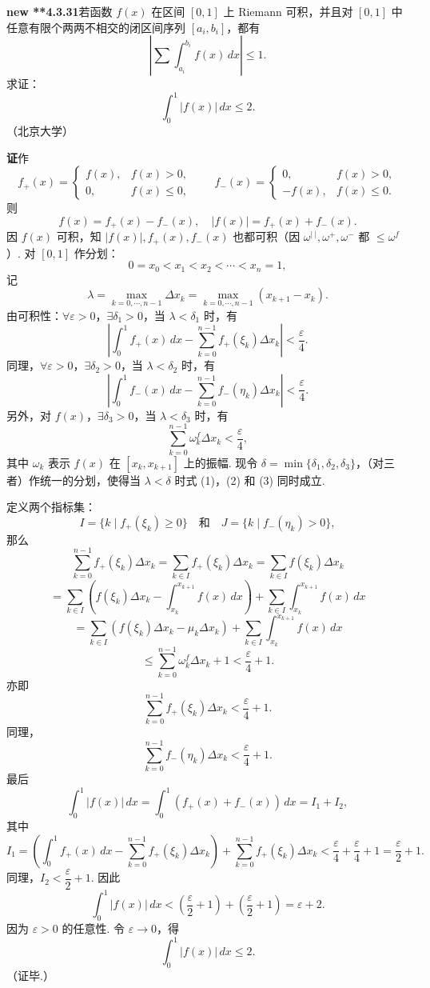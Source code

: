 \documentclass[UTF8, 12pt, fontset=fandol, oneside]{ctexart}
\begin{document}
\noindent\textbf{new **4.3.31}\quad 若函数 $f(x)$ 在区间 $[0,1]$ 上 Riemann 可积，并且对
$[0,1]$ 中任意有限个两两不相交的闭区间序列 $[a_i,b_i]$，都有
\[
\left|\sum\int_{a_i}^{b_i}f(x)\,dx\right|\le1.
\]
求证：
\[
\int_0^1|f(x)|\,dx\le2.
\]
（北京大学）

\noindent\textbf{证}\quad 作
\[
f_+(x)=
\begin{cases}
f(x),& f(x)>0,\\
0,& f(x)\le0,
\end{cases}
\qquad
f_-(x)=
\begin{cases}
0,& f(x)>0,\\
-f(x),& f(x)\le0.
\end{cases}
\]
则
\[
f(x)=f_+(x)-f_-(x),\quad |f(x)|=f_+(x)+f_-(x).
\]
因 $f(x)$ 可积，知 $|f(x)|,f_+(x),f_-(x)$ 也都可积（因
$\omega^{|\ |},\omega^+,\omega^-$ 都 $\le\omega^f$）.
对 $[0,1]$ 作分划：
\[
0=x_0<x_1<x_2<\cdots<x_n=1,
\]
记
\[
\lambda=\max_{k=0,\cdots,n-1}\Delta x_k
=\max_{k=0,\cdots,n-1}(x_{k+1}-x_k).
\]
由可积性：$\forall\varepsilon>0$，$\exists\delta_1>0$，当 $\lambda<\delta_1$ 时，有
\[
\left|\int_0^1 f_+(x)\,dx-\sum_{k=0}^{n-1}f_+(\xi_k)\Delta x_k\right|<\frac\varepsilon4. \tag{1}
\]
同理，$\forall\varepsilon>0$，$\exists\delta_2>0$，当 $\lambda<\delta_2$ 时，有
\[
\left|\int_0^1 f_-(x)\,dx-\sum_{k=0}^{n-1}f_-(\eta_k)\Delta x_k\right|<\frac\varepsilon4. \tag{2}
\]
另外，对 $f(x)$，$\exists\delta_3>0$，当 $\lambda<\delta_3$ 时，有
\[
\sum_{k=0}^{n-1}\omega_k^f\Delta x_k<\frac\varepsilon4, \tag{3}
\]
其中 $\omega_k$ 表示 $f(x)$ 在 $[x_k,x_{k+1}]$ 上的振幅. 现令
$\delta=\min\{\delta_1,\delta_2,\delta_3\}$，（对三者）作统一的分划，使得当
$\lambda<\delta$ 时式 (1)，(2) 和 (3) 同时成立.

定义两个指标集：
\[
I=\{k\mid f_+(\xi_k)\ge0\}\quad\text{和}\quad
J=\{k\mid f_-(\eta_k)>0\},
\]
那么
\[
\sum_{k=0}^{n-1}f_+(\xi_k)\Delta x_k
=\sum_{k\in I}f_+(\xi_k)\Delta x_k
=\sum_{k\in I}f(\xi_k)\Delta x_k
\]
\[
=\sum_{k\in I}\left(f(\xi_k)\Delta x_k-\int_{x_k}^{x_{k+1}}f(x)\,dx\right)
+\sum_{k\in I}\int_{x_k}^{x_{k+1}}f(x)\,dx
\]
\[
=\sum_{k\in I}(f(\xi_k)\Delta x_k-\mu_k\Delta x_k)
+\sum_{k\in I}\int_{x_k}^{x_{k+1}}f(x)\,dx
\]
\[
\le\sum_{k=0}^{n-1}\omega_k^f\Delta x_k+1
<\frac\varepsilon4+1.
\]
亦即
\[
\sum_{k=0}^{n-1}f_+(\xi_k)\Delta x_k<\frac\varepsilon4+1. \tag{4}
\]
同理，
\[
\sum_{k=0}^{n-1}f_-(\eta_k)\Delta x_k<\frac\varepsilon4+1. \tag{5}
\]
最后
\[
\int_0^1|f(x)|\,dx=\int_0^1(f_+(x)+f_-(x))\,dx=I_1+I_2,
\]
其中
\[
I_1=\left(\int_0^1f_+(x)\,dx-\sum_{k=0}^{n-1}f_+(\xi_k)\Delta x_k\right)
+\sum_{k=0}^{n-1}f_+(\xi_k)\Delta x_k
<\frac\varepsilon4+\frac\varepsilon4+1=\frac\varepsilon2+1.
\]
同理，$I_2<\dfrac\varepsilon2+1$. 因此
\[
\int_0^1|f(x)|\,dx<\left(\frac\varepsilon2+1\right)
+\left(\frac\varepsilon2+1\right)=\varepsilon+2.
\]
因为 $\varepsilon>0$ 的任意性. 令 $\varepsilon\to0$，得
\[
\int_0^1|f(x)|\,dx\le2.
\]
（证毕.）
\end{document}
